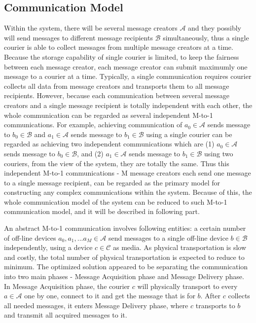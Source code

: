\subsection{Communication Model}
Within the system, there will be several message creators $ \mathcal{A} $ and they possibly will send messages to different message recipients $ \mathcal{B} $ simultaneously, thus a single courier is able to collect messages from multiple message creators at a time. Because the storage capability of single courier is limited, to keep the fairness between each message creator, each message creator can submit maximumly one message to a courier at a time. Typically, a single communication requires courier collects all data from message creators and transports them to all message recipients. However, because each communication between several message creators and a single message recipient is totally independent with each other, the whole communication can be regarded as several independent M-to-1 communications. For example, achieving communication of $a_0 \in \mathcal{A}$ sends message to $ b_0 \in \mathcal{B} $ and $a_1 \in \mathcal{A}$ sends message to $ b_1 \in \mathcal{B} $ using a single courier can be regarded as achieving two independent communications which are (1) $a_0 \in \mathcal{A}$ sends message to $ b_0 \in \mathcal{B} $, and (2) $a_1 \in \mathcal{A}$ sends message to $ b_1 \in \mathcal{B} $ using two couriers, from the view of the system, they are totally the same. Thus this independent M-to-1 communications - M message creators each send one message to a single message recipient, can be regarded as the primary model for constructing any complex communications within the system. Because of this, the whole communication model of the system can be reduced to such M-to-1 communication model, and it will be described in following part.

An abstract M-to-1 communication involves following entities: a certain number of off-line devices $a_0, a_1, ... a_M \in \mathcal{A}$ send messages to a single off-line device $b \in \mathcal{B}$ independently, using a device $c \in \mathcal{C}$ as media. As physical transportation is slow and costly, the total number of physical transportation is expected to reduce to minimum. The optimized solution appeared to be separating the communication into two main phases - Message Acquisition phase and Message Delivery phase. In Message Acquisition phase, the courier $c$ will physically transport to every $a \in \mathcal{A}$ one by one, connect to it and get the message that is for $b$. After $c$ collects all needed messages, it enters Message Delivery phase, where $c$ transports to $b$ and transmit all acquired messages to it.

